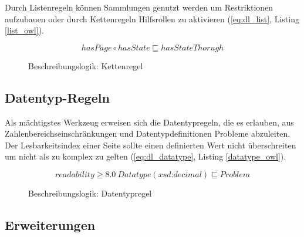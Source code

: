 \documentclass[runningheads,a4paper]{llncs}
\begin{document}
Durch Listenregeln können Sammlungen genutzt werden um Restriktionen aufzubauen oder durch Kettenregeln Hilfsrollen zu aktivieren (\eqref{eq:dl_list}, Listing \ref{list_owl}).

\begin{figure}
\begin{equation}
hasPage \circ hasState \sqsubseteq hasStateThorugh
\label{eq:dl_list}
\end{equation}
\caption{Beschreibungslogik: Kettenregel}
\end{figure}



\subsection{Datentyp-Regeln}
\label{sec:rule_datatype}

Als mächtigstes Werkzeug erweisen sich die Datentypregeln, die es erlauben, aus Zahlenbereichseinschränkungen und Datentypdefinitionen Probleme abzuleiten. 
Der Lesbarkeitsindex einer Seite sollte einen definierten Wert nicht überschreiten um nicht als zu komplex zu gelten (\eqref{eq:dl_datatype}, Listing \ref{datatype_owl}).


\begin{figure}
\begin{equation}
readability \geq 8.0\ Datatype(\textit{xsd:decimal}) \sqsubseteq Problem
\label{eq:dl_datatype}
\end{equation}
\caption{Beschreibungslogik: Datentypregel}
\end{figure}



\subsection{Erweiterungen}
\label{sec:rule_extensions}
\end{document}
